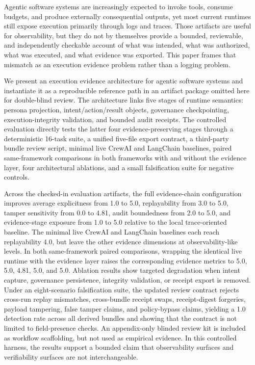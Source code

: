 Agentic software systems are increasingly expected to invoke tools, consume budgets, and produce externally consequential outputs, yet most current runtimes still expose execution primarily through logs and traces. Those artifacts are useful for observability, but they do not by themselves provide a bounded, reviewable, and independently checkable account of what was intended, what was authorized, what was executed, and what evidence was exported. This paper frames that mismatch as an execution evidence problem rather than a logging problem.

We present an execution evidence architecture for agentic software systems and instantiate it as a reproducible reference path in an artifact package omitted here for double-blind review. The architecture links five stages of runtime semantics: persona projection, intent/action/result objects, governance checkpointing, execution-integrity validation, and bounded audit receipts. The controlled evaluation directly tests the latter four evidence-preserving stages through a deterministic 16-task suite, a unified five-file export contract, a third-party bundle review script, minimal live CrewAI and LangChain baselines, paired same-framework comparisons in both frameworks with and without the evidence layer, four architectural ablations, and a small falsification suite for negative controls.

Across the checked-in evaluation artifacts, the full evidence-chain configuration improves average explicitness from 1.0 to 5.0, replayability from 3.0 to 5.0, tamper sensitivity from 0.0 to 4.81, audit boundedness from 2.0 to 5.0, and evidence-stage exposure from 1.0 to 5.0 relative to the local trace-oriented baseline. The minimal live CrewAI and LangChain baselines each reach replayability 4.0, but leave the other evidence dimensions at observability-like levels. In both same-framework paired comparisons, wrapping the identical live runtime with the evidence layer raises the corresponding evidence metrics to 5.0, 5.0, 4.81, 5.0, and 5.0. Ablation results show targeted degradation when intent capture, governance persistence, integrity validation, or receipt export is removed. Under an eight-scenario falsification suite, the updated review contract rejects cross-run replay mismatches, cross-bundle receipt swaps, receipt-digest forgeries, payload tampering, false tamper claims, and policy-bypass claims, yielding a 1.0 detection rate across all derived bundles and showing that the contract is not limited to field-presence checks. An appendix-only blinded review kit is included as workflow scaffolding, but not used as empirical evidence. In this controlled harness, the results support a bounded claim that observability surfaces and verifiability surfaces are not interchangeable.
